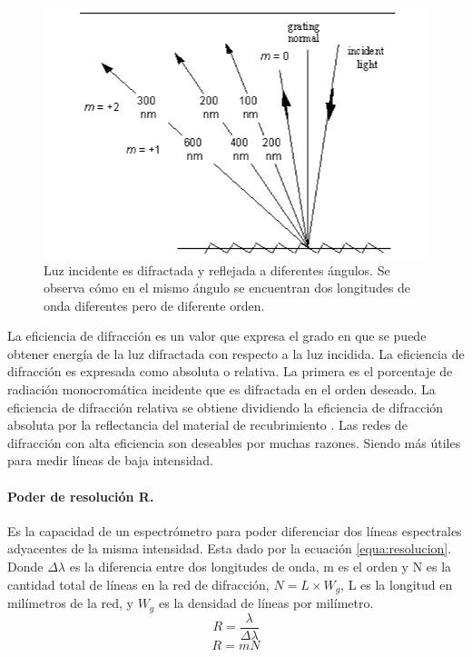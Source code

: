 \begin{figure}[h]
	\centering
	\includegraphics[width=0.7\linewidth]{Imagenes/2/ordenes}
	\caption[Difracción de la luz se aprecia el orden de difracción de diferentes longitudes de onda.]{Luz incidente es difractada y reflejada a diferentes ángulos. Se observa cómo en el mismo ángulo se encuentran dos longitudes de onda diferentes pero de diferente orden. \cite{Palmer2005}}
	\label{fig:ordenes}
\end{figure}


La eficiencia de difracción es un valor que expresa el grado en que se puede obtener energía de la luz difractada con respecto a la luz incidida.
La eficiencia de difracción es expresada como absoluta o relativa. La primera es el porcentaje de radiación monocromática incidente que es difractada en el orden deseado. La eficiencia de difracción relativa se obtiene dividiendo la eficiencia de difracción absoluta por la reflectancia del material de recubrimiento \cite{Shimadzu}.
Las redes de difracción con alta eficiencia son deseables por muchas razones. Siendo más útiles para medir líneas de baja intensidad. \cite{Palmer2005}

\paragraph{Poder de resolución R.} 
Es la capacidad de un espectrómetro para poder diferenciar dos líneas espectrales adyacentes de la misma intensidad. Esta dado por la ecuación \ref{equa:resolucion}. Donde $\Delta\lambda$ es la diferencia entre dos longitudes de onda, m es el orden y N es la cantidad total de líneas en la red de difracción, $N= L\times W_g$, L es la longitud en milímetros de la red, y $W_g$ es la densidad de líneas por milímetro.
\begin{equation}
	R = \frac{\lambda}{\Delta \lambda}
	\label{equa:resolucion}
\end{equation}
\begin{equation}
	R = mN
	\label{equa:resolucion2}
\end{equation}

